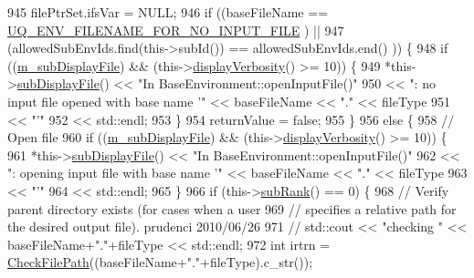 \begin{DoxyCode}
945   filePtrSet.ifsVar = NULL;
946   \textcolor{keywordflow}{if} ((baseFileName                         == \hyperlink{_environment_options_8h_a892d0b4584a84b0dd25ce41a69493bf3}{UQ\_ENV\_FILENAME\_FOR\_NO\_INPUT\_FILE}
      ) ||
947       (allowedSubEnvIds.find(this->subId()) == allowedSubEnvIds.end()           )) \{
948     \textcolor{keywordflow}{if} ((\hyperlink{class_q_u_e_s_o_1_1_base_environment_a52b4275aa8ee85994dd304d9fe95c9c5}{m\_subDisplayFile}) && (this->\hyperlink{class_q_u_e_s_o_1_1_base_environment_a1fe5f244fc0316a0ab3e37463f108b96}{displayVerbosity}() >= 10)) \{
949       *this->\hyperlink{class_q_u_e_s_o_1_1_base_environment_a8a0064746ae8dddfece4229b9ad374d6}{subDisplayFile}() << \textcolor{stringliteral}{"In BaseEnvironment::openInputFile()"}
950                               << \textcolor{stringliteral}{": no input file opened with base name '"} << baseFileName << \textcolor{stringliteral}{"."} << 
      fileType
951                               << \textcolor{stringliteral}{"'"}
952                               << std::endl;
953     \}
954     returnValue = \textcolor{keyword}{false};
955   \}
956   \textcolor{keywordflow}{else} \{
958     \textcolor{comment}{// Open file}
960 \textcolor{comment}{}    \textcolor{keywordflow}{if} ((\hyperlink{class_q_u_e_s_o_1_1_base_environment_a52b4275aa8ee85994dd304d9fe95c9c5}{m\_subDisplayFile}) && (this->\hyperlink{class_q_u_e_s_o_1_1_base_environment_a1fe5f244fc0316a0ab3e37463f108b96}{displayVerbosity}() >= 10)) \{
961       *this->\hyperlink{class_q_u_e_s_o_1_1_base_environment_a8a0064746ae8dddfece4229b9ad374d6}{subDisplayFile}() << \textcolor{stringliteral}{"In BaseEnvironment::openInputFile()"}
962                               << \textcolor{stringliteral}{": opening input file with base name '"} << baseFileName << \textcolor{stringliteral}{"."} << fileType
963                               << \textcolor{stringliteral}{"'"}
964                               << std::endl;
965     \}
966     \textcolor{keywordflow}{if} (this->\hyperlink{class_q_u_e_s_o_1_1_base_environment_a172d52f993f1322ed45aaddf71518dbb}{subRank}() == 0) \{
968       \textcolor{comment}{// Verify parent directory exists (for cases when a user}
969       \textcolor{comment}{// specifies a relative path for the desired output file). prudenci 2010/06/26}
971 \textcolor{comment}{}      \textcolor{comment}{// std::cout << "checking " << baseFileName+"."+fileType << std::endl;}
972       \textcolor{keywordtype}{int} irtrn = \hyperlink{namespace_q_u_e_s_o_abc55c11f68bb99c4eba88030f1164764}{CheckFilePath}((baseFileName+\textcolor{stringliteral}{"."}+fileType).c\_str());

\end{DoxyCode}
